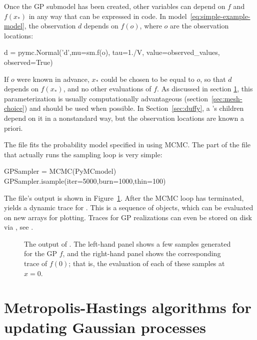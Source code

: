 \documentclass[article]{jss}
\begin{document}
Once the GP submodel has been created, other variables can depend on $f$ and $f(x_*)$ in any way that can be expressed in  code. In model~\ref{eq:simple-example-model}, the observation $d$ depends on $f(o)$, where $o$ are the observation locations:
\begin{CodeChunk}
\begin{CodeInput}
d = pymc.Normal('d',mu=sm.f(o), tau=1./V, value=observed_values, observed=True)
\end{CodeInput}
\end{CodeChunk}
If $o$ were known in advance, $x_*$ could be chosen to be equal to $o$, so that $d$ depends on $f(x_*)$, and no other evaluations of $f$. As discussed in section \ref{sec:step-methods}, this parameterization is usually computationally advantageous (section~\ref{sec:mesh-choice}) and should be used when possible. In Section~\ref{sec:duffy}, a 's children depend on it in a nonstandard way, but the observation locations are known a priori. 

The file  fits the probability model specified in  using MCMC. The part of the file that actually runs the sampling loop is very simple:
\begin{CodeChunk}
\begin{CodeInput}
GPSampler = MCMC(PyMCmodel)
GPSampler.isample(iter=5000,burn=1000,thin=100)    
\end{CodeInput}
\end{CodeChunk}
The file's output is shown in Figure~\ref{fig:MCMCOutput}. After the MCMC loop has terminated, \\ yields a dynamic trace for . This is a sequence of  objects, which can be evaluated on new arrays for plotting. Traces for GP realizations can even be stored on disk via  \citep{tables}, see \cite{pymc}.

\begin{figure}
    \centering
    \caption{The output of . The left-hand panel shows a few samples generated for the GP $f$, and the right-hand panel shows the corresponding trace of $f(0)$; that is, the evaluation of each of these samples at $x=0$.}
    \label{fig:MCMCOutput}
\end{figure}
 

\section{Metropolis-Hastings algorithms for updating Gaussian processes}
\label{sec:step-methods}
\end{document}
